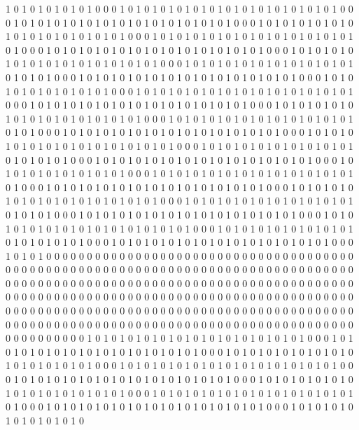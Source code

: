 1 0 1 0 1 0 1 0 1 0 1 0 0 0 1 0 1 0 1 0 1 0 1 0 1 0 1 0 1 0 1 0 1 0 1 0 1 0 1 0 1 0 0 0 1 0 1 0 1 0 1 0 1 0 1 0 1 0 1 0 1 0 1 0 1 0 1 0 1 0 1 0 0 0 1 0 1 0 1 0 1 0 1 0 1 0 1 0 1 0 1 0 1 0 1 0 1 0 1 0 1 0 0 0 1 0 1 0 1 0 1 0 1 0 1 0 1 0 1 0 1 0 1 0 1 0 1 0 1 0 1 0 0 0 1 0 1 0 1 0 1 0 1 0 1 0 1 0 1 0 1 0 1 0 1 0 1 0 1 0 1 0 0 0 1 0 1 0 1 0 1 0 1 0 1 0 1 0 1 0 1 0 1 0 1 0 1 0 1 0 1 0 0 0 1 0 1 0 1 0 1 0 1 0 1 0 1 0 1 0 1 0 1 0 1 0 1 0 1 0 1 0 0 0 1 0 1 0 1 0 1 0 1 0 1 0 1 0 1 0 1 0 1 0 1 0 1 0 1 0 1 0 0 0 1 0 1 0 1 0 
1 0 1 0 1 0 1 0 1 0 1 0 0 0 1 0 1 0 1 0 1 0 1 0 1 0 1 0 1 0 1 0 1 0 1 0 1 0 1 0 1 0 0 0 1 0 1 0 1 0 1 0 1 0 1 0 1 0 1 0 1 0 1 0 1 0 1 0 1 0 1 0 0 0 1 0 1 0 1 0 1 0 1 0 1 0 1 0 1 0 1 0 1 0 1 0 1 0 1 0 1 0 0 0 1 0 1 0 1 0 1 0 1 0 1 0 1 0 1 0 1 0 1 0 1 0 1 0 1 0 1 0 0 0 1 0 1 0 1 0 1 0 1 0 1 0 1 0 1 0 1 0 1 0 1 0 1 0 1 0 1 0 0 0 1 0 1 0 1 0 1 0 1 0 1 0 1 0 1 0 1 0 1 0 1 0 1 0 1 0 1 0 0 0 1 0 1 0 1 0 1 0 1 0 1 0 1 0 1 0 1 0 1 0 1 0 1 0 1 0 1 0 0 0 1 0 1 0 1 0 1 0 1 0 1 0 1 0 1 0 1 0 1 0 1 0 1 0 1 0 1 0 0 0 1 0 1 0 1 0 
1 0 1 0 1 0 1 0 1 0 1 0 0 0 1 0 1 0 1 0 1 0 1 0 1 0 1 0 1 0 1 0 1 0 1 0 1 0 1 0 1 0 0 0 1 0 1 0 1 0 1 0 1 0 1 0 1 0 1 0 1 0 1 0 1 0 1 0 1 0 1 0 0 0 1 0 1 0 1 0 1 0 1 0 1 0 1 0 1 0 1 0 1 0 1 0 1 0 1 0 1 0 0 0 1 0 1 0 1 0 1 0 1 0 1 0 1 0 1 0 1 0 1 0 1 0 1 0 1 0 1 0 0 0 1 0 1 0 1 0 1 0 1 0 1 0 1 0 1 0 1 0 1 0 1 0 1 0 1 0 1 0 0 0 1 0 1 0 1 0 1 0 1 0 1 0 1 0 1 0 1 0 1 0 1 0 1 0 1 0 1 0 0 0 1 0 1 0 1 0 1 0 1 0 1 0 1 0 1 0 1 0 1 0 1 0 1 0 1 0 1 0 0 0 1 0 1 0 1 0 1 0 1 0 1 0 1 0 1 0 1 0 1 0 1 0 1 0 1 0 1 0 0 0 1 0 1 0 1 0 
0 0 0 0 0 0 0 0 0 0 0 0 0 0 0 0 0 0 0 0 0 0 0 0 0 0 0 0 0 0 0 0 0 0 0 0 0 0 0 0 0 0 0 0 0 0 0 0 0 0 0 0 0 0 0 0 0 0 0 0 0 0 0 0 0 0 0 0 0 0 0 0 0 0 0 0 0 0 0 0 0 0 0 0 0 0 0 0 0 0 0 0 0 0 0 0 0 0 0 0 0 0 0 0 0 0 0 0 0 0 0 0 0 0 0 0 0 0 0 0 0 0 0 0 0 0 0 0 0 0 0 0 0 0 0 0 0 0 0 0 0 0 0 0 0 0 0 0 0 0 0 0 0 0 0 0 0 0 0 0 0 0 0 0 0 0 0 0 0 0 0 0 0 0 0 0 0 0 0 0 0 0 0 0 0 0 0 0 0 0 0 0 0 0 0 0 0 0 0 0 0 0 0 0 0 0 0 0 0 0 0 0 0 0 0 0 0 0 0 0 0 0 0 0 0 0 0 0 0 0 0 0 0 0 0 0 0 0 0 0 0 0 0 0 0 0 0 0 0 0 0 0 0 0 0 0 0 0 0 0 
0 0 1 0 1 0 1 0 1 0 1 0 1 0 1 0 1 0 1 0 1 0 1 0 1 0 1 0 1 0 0 0 1 0 1 0 1 0 1 0 1 0 1 0 1 0 1 0 1 0 1 0 1 0 1 0 1 0 1 0 0 0 1 0 1 0 1 0 1 0 1 0 1 0 1 0 1 0 1 0 1 0 1 0 1 0 1 0 1 0 0 0 1 0 1 0 1 0 1 0 1 0 1 0 1 0 1 0 1 0 1 0 1 0 1 0 1 0 1 0 0 0 1 0 1 0 1 0 1 0 1 0 1 0 1 0 1 0 1 0 1 0 1 0 1 0 1 0 1 0 0 0 1 0 1 0 1 0 1 0 1 0 1 0 1 0 1 0 1 0 1 0 1 0 1 0 1 0 1 0 0 0 1 0 1 0 1 0 1 0 1 0 1 0 1 0 1 0 1 0 1 0 1 0 1 0 1 0 1 0 0 0 1 0 1 0 1 0 1 0 1 0 1 0 1 0 1 0 1 0 1 0 1 0 1 0 1 0 1 0 0 0 1 0 1 0 1 0 1 0 1 0 1 0 1 0 1 0 1 0 
